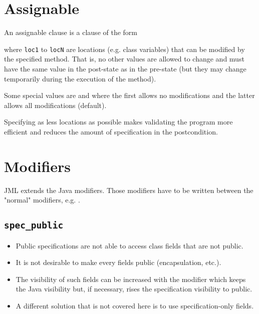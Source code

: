 	\section{Assignable}
		An assignable clause is a clause of the form
		\begin{center}
		\end{center}
		where \texttt{loc1} to \texttt{locN} are locations (e.g. class variables) that can be modified by the specified method. That is, no other values are allowed to change and must have the same value in the post-state as in the pre-state (but they may change temporarily during the execution of the method).
		
		Some special values are \inlineJava{\\nothing} and \inlineJava{\\everything} where the first allows no modifications and the latter allows all modifications (default).
		
		Specifying as less locations as possible makes validating the program more efficient and reduces the amount of specification in the postcondition.

	\section{Modifiers}
		\label{sec:additionalmod}
	
		JML extends the Java modifiers. Those modifiers have to be written between the "normal" modifiers, e.g. .
	
		\subsection{\texttt{spec\_public}}
			\label{sec:specpub}
		
			\begin{itemize}
				\item Public specifications are not able to access class fields that are not public.
				\item It is not desirable to make every fields public (encapsulation, etc.).
				\item The visibility of such fields can be increased with the modifier  which keeps the Java visibility but, if necessary, rises the specification visibility to public.
				\item A different solution that is not covered here is to use specification-only fields.
			\end{itemize}

